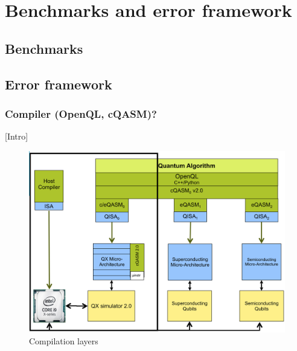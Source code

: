 
\chapter*{Benchmarks and error framework}
\label{sec:orged1c825}
\section*{Benchmarks}
\label{sec:org655dae6}
\section*{Error framework}
\label{sec:orge5d739c}
\subsection*{Compiler (OpenQL, cQASM)?}
\label{sec:org6d182f4}

[Intro]


\begin{figure}[htbp]
\centering
\includegraphics[width=\textwidth]{figures/layers.png}
\caption{\label{fig:org0eb0940}
Compilation layers}
\end{figure}



